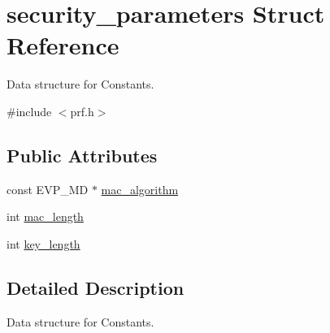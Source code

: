 \hypertarget{structsecurity__parameters}{\section{security\-\_\-parameters Struct Reference}
\label{structsecurity__parameters}
}


Data structure for Constants.  




{\ttfamily \#include $<$prf.\-h$>$}

\subsection*{Public Attributes}
\begin{DoxyCompactItemize}
\item 
const E\-V\-P\-\_\-\-M\-D $\ast$ \hyperlink{structsecurity__parameters_a86561290bd325ef969a3450ab8868966}{mac\-\_\-algorithm}
\item 
int \hyperlink{structsecurity__parameters_ae14edd76dec6b2c7b9a427b892e275d0}{mac\-\_\-length}
\item 
int \hyperlink{structsecurity__parameters_a29b3227de735a7c1e0d0083a75746015}{key\-\_\-length}
\end{DoxyCompactItemize}


\subsection{Detailed Description}
Data structure for Constants. 

